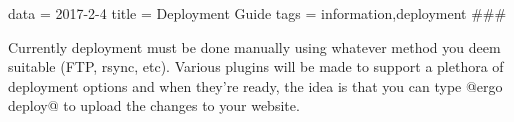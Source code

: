 data = 2017-2-4
title = Deployment Guide
tags = information,deployment
###

Currently deployment must be done manually using whatever method you deem suitable (FTP, rsync, etc). Various plugins will be made to support a plethora of deployment options and when they're ready, the idea is that you can type @ergo deploy@ to upload the changes to your website.


